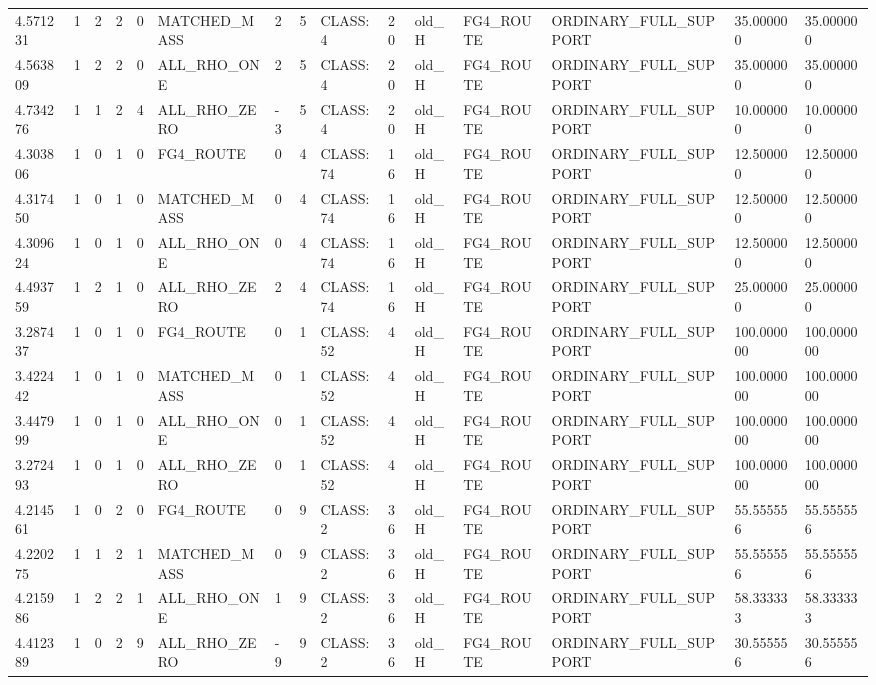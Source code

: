 \begin{tabular}{lllllllllllllll}
4.571231 & 1 & 2 & 2 & 0 & MATCHED\_MASS & 2 & 5 & CLASS:4 & 20 & old\_H & FG4\_ROUTE & ORDINARY\_FULL\_SUPPORT & 35.000000 & 35.000000 \\
4.563809 & 1 & 2 & 2 & 0 & ALL\_RHO\_ONE & 2 & 5 & CLASS:4 & 20 & old\_H & FG4\_ROUTE & ORDINARY\_FULL\_SUPPORT & 35.000000 & 35.000000 \\
4.734276 & 1 & 1 & 2 & 4 & ALL\_RHO\_ZERO & -3 & 5 & CLASS:4 & 20 & old\_H & FG4\_ROUTE & ORDINARY\_FULL\_SUPPORT & 10.000000 & 10.000000 \\
4.303806 & 1 & 0 & 1 & 0 & FG4\_ROUTE & 0 & 4 & CLASS:74 & 16 & old\_H & FG4\_ROUTE & ORDINARY\_FULL\_SUPPORT & 12.500000 & 12.500000 \\
4.317450 & 1 & 0 & 1 & 0 & MATCHED\_MASS & 0 & 4 & CLASS:74 & 16 & old\_H & FG4\_ROUTE & ORDINARY\_FULL\_SUPPORT & 12.500000 & 12.500000 \\
4.309624 & 1 & 0 & 1 & 0 & ALL\_RHO\_ONE & 0 & 4 & CLASS:74 & 16 & old\_H & FG4\_ROUTE & ORDINARY\_FULL\_SUPPORT & 12.500000 & 12.500000 \\
4.493759 & 1 & 2 & 1 & 0 & ALL\_RHO\_ZERO & 2 & 4 & CLASS:74 & 16 & old\_H & FG4\_ROUTE & ORDINARY\_FULL\_SUPPORT & 25.000000 & 25.000000 \\
3.287437 & 1 & 0 & 1 & 0 & FG4\_ROUTE & 0 & 1 & CLASS:52 & 4 & old\_H & FG4\_ROUTE & ORDINARY\_FULL\_SUPPORT & 100.000000 & 100.000000 \\
3.422442 & 1 & 0 & 1 & 0 & MATCHED\_MASS & 0 & 1 & CLASS:52 & 4 & old\_H & FG4\_ROUTE & ORDINARY\_FULL\_SUPPORT & 100.000000 & 100.000000 \\
3.447999 & 1 & 0 & 1 & 0 & ALL\_RHO\_ONE & 0 & 1 & CLASS:52 & 4 & old\_H & FG4\_ROUTE & ORDINARY\_FULL\_SUPPORT & 100.000000 & 100.000000 \\
3.272493 & 1 & 0 & 1 & 0 & ALL\_RHO\_ZERO & 0 & 1 & CLASS:52 & 4 & old\_H & FG4\_ROUTE & ORDINARY\_FULL\_SUPPORT & 100.000000 & 100.000000 \\
4.214561 & 1 & 0 & 2 & 0 & FG4\_ROUTE & 0 & 9 & CLASS:2 & 36 & old\_H & FG4\_ROUTE & ORDINARY\_FULL\_SUPPORT & 55.555556 & 55.555556 \\
4.220275 & 1 & 1 & 2 & 1 & MATCHED\_MASS & 0 & 9 & CLASS:2 & 36 & old\_H & FG4\_ROUTE & ORDINARY\_FULL\_SUPPORT & 55.555556 & 55.555556 \\
4.215986 & 1 & 2 & 2 & 1 & ALL\_RHO\_ONE & 1 & 9 & CLASS:2 & 36 & old\_H & FG4\_ROUTE & ORDINARY\_FULL\_SUPPORT & 58.333333 & 58.333333 \\
4.412389 & 1 & 0 & 2 & 9 & ALL\_RHO\_ZERO & -9 & 9 & CLASS:2 & 36 & old\_H & FG4\_ROUTE & ORDINARY\_FULL\_SUPPORT & 30.555556 & 30.555556 \\

\end{tabular}
